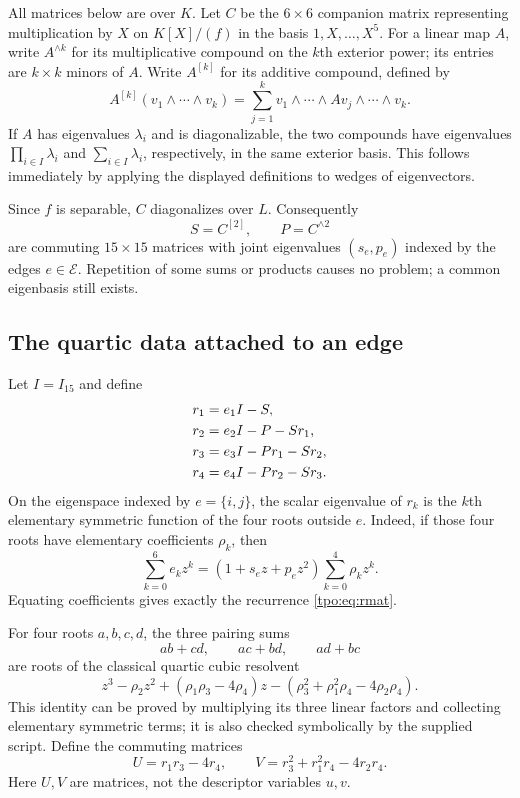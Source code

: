 \documentclass[11pt,letterpaper]{article}
\numberwithin{equation}{section}
\theoremstyle{definition}
\theoremstyle{remark}
\newcommand{\Edges}{\mathcal E}
\begin{document}
All matrices below are over $K$. Let $C$ be the $6\times6$ companion matrix
representing multiplication by $X$ on $K[X]/(f)$ in the basis
$1,X,\ldots,X^5$. For a linear map $A$, write $A^{\wedge k}$ for its
multiplicative compound on the $k$th exterior power; its entries are $k\times k$
minors of $A$. Write $A^{[k]}$ for its additive compound, defined by
\[
 A^{[k]}(v_1\wedge\cdots\wedge v_k)
 =\sum_{j=1}^k v_1\wedge\cdots\wedge Av_j\wedge\cdots\wedge v_k.
\]
If $A$ has eigenvalues $\lambda_i$ and is diagonalizable, the two compounds
have eigenvalues $\prod_{i\in I}\lambda_i$ and $\sum_{i\in I}\lambda_i$,
respectively, in the same exterior basis. This follows immediately by
applying the displayed definitions to wedges of eigenvectors.

Since $f$ is separable, $C$ diagonalizes over $L$. Consequently
\begin{equation}
 S=C^{[2]},\qquad P=C^{\wedge2}
 \label{tpo:eq:SP}
\end{equation}
are commuting $15\times15$ matrices with joint eigenvalues
$(s_e,p_e)$ indexed by the edges $e\in\Edges$. Repetition of some sums or products
causes no problem; a common eigenbasis still exists.

\subsection{The quartic data attached to an edge}
Let $I=I_{15}$ and define
\begin{align}
 r_1&=e_1I-S,\notag\\
 r_2&=e_2I-P-Sr_1,\notag\\
 r_3&=e_3I-Pr_1-Sr_2,\notag\\
 r_4&=e_4I-Pr_2-Sr_3.
 \label{tpo:eq:rmat}
\end{align}
On the eigenspace indexed by $e=\{i,j\}$, the scalar eigenvalue of $r_k$ is
the $k$th elementary symmetric function of the four roots outside $e$.
Indeed, if those four roots have elementary coefficients $\rho_k$, then
\[
 \sum_{k=0}^6 e_k z^k=(1+s_ez+p_ez^2)
                         \sum_{k=0}^4\rho_kz^k.
\]
Equating coefficients gives exactly the recurrence \eqref{tpo:eq:rmat}.

For four roots $a,b,c,d$, the three pairing sums
\[
 ab+cd,\qquad ac+bd,\qquad ad+bc
\]
are roots of the classical quartic cubic resolvent
\begin{equation}
 z^3-\rho_2z^2+(\rho_1\rho_3-4\rho_4)z
 -(\rho_3^2+\rho_1^2\rho_4-4\rho_2\rho_4).
 \label{tpo:eq:quartic}
\end{equation}
This identity can be proved by multiplying its three linear factors and
collecting elementary symmetric terms; it is also checked symbolically by the
supplied script. Define the commuting matrices
\begin{equation}
 U=r_1r_3-4r_4,\qquad V=r_3^2+r_1^2r_4-4r_2r_4.
 \label{tpo:eq:UV}
\end{equation}
Here $U,V$ are matrices, not the descriptor variables $u,v$.
\end{document}

